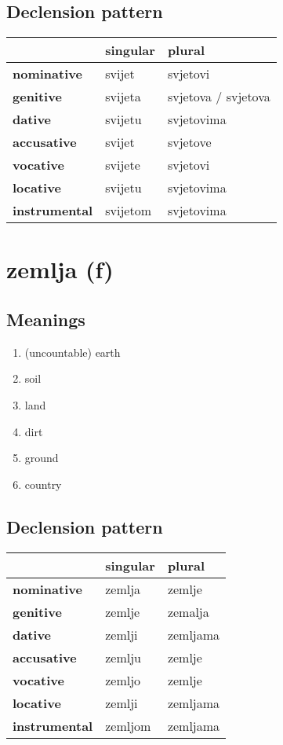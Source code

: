 \subsection*{Declension pattern}
\begin{tabularx}{\linewidth}{Xll}
\toprule
{} &  singular &               plural \\
\midrule
\textbf{nominative  } &    svijet &             svjetovi \\
\textbf{genitive    } &   svijeta &  svjetova / svjetova \\
\textbf{dative      } &   svijetu &           svjetovima \\
\textbf{accusative  } &    svijet &             svjetove \\
\textbf{vocative    } &   svijete &             svjetovi \\
\textbf{locative    } &   svijetu &           svjetovima \\
\textbf{instrumental} &  svijetom &           svjetovima \\
\bottomrule
\end{tabularx}

\filbreak
\section{zemlja (f)}
\subsection*{Meanings}
\begin{enumerate}
\item (uncountable) earth
\item soil
\item land
\item dirt
\item ground
\item country
\end{enumerate}
\subsection*{Declension pattern}
\begin{tabularx}{\linewidth}{Xll}
\toprule
{} & singular &    plural \\
\midrule
\textbf{nominative  } &   zemlja &    zemlje \\
\textbf{genitive    } &   zemlje &   zemalja \\
\textbf{dative      } &   zemlji &  zemljama \\
\textbf{accusative  } &   zemlju &    zemlje \\
\textbf{vocative    } &   zemljo &    zemlje \\
\textbf{locative    } &   zemlji &  zemljama \\
\textbf{instrumental} &  zemljom &  zemljama \\
\bottomrule
\end{tabularx}

